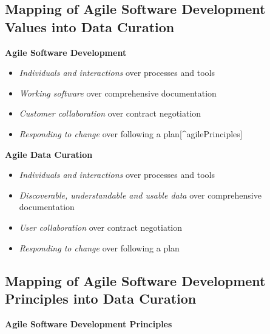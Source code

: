 \documentclass[final]{beamer}
\providecommand{\tightlist}{%
  \setlength{\itemsep}{0pt}\setlength{\parskip}{0pt}}
\begin{document}
\begin{frame}[t]
\begin{multicols}{2}
\subsection{Mapping of Agile Software Development Values into Data
Curation}\label{mapping-of-agile-software-development-values-into-data-curation}

\textbf{Agile Software Development}

\begin{itemize}
\tightlist
\item
  \emph{Individuals and interactions} over processes and tools
\item
  \emph{Working software} over comprehensive documentation
\item
  \emph{Customer collaboration} over contract negotiation
\item
  \emph{Responding to change} over following a
  plan{[}\^{}agilePrinciples{]}
\end{itemize}

\textbf{Agile Data Curation}

\begin{itemize}
\tightlist
\item
  \emph{Individuals and interactions} over processes and tools
\item
  \emph{Discoverable, understandable and usable data} over comprehensive
  documentation
\item
  \emph{User collaboration} over contract negotiation
\item
  \emph{Responding to change} over following a plan
\end{itemize}

\subsection{Mapping of Agile Software Development Principles into Data
Curation}\label{principles}

\textbf{Agile Software Development Principles}


\end{multicols}
\end{frame}
\end{document}
